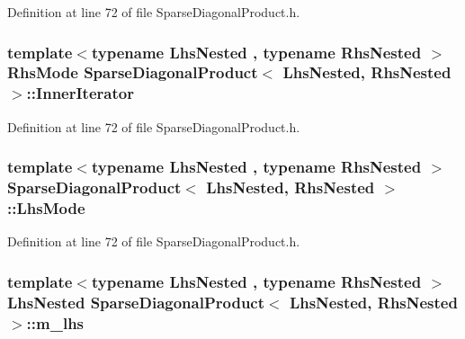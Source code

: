 Definition at line 72 of file Sparse\-Diagonal\-Product.\-h.

\hypertarget{class_sparse_diagonal_product_a5c59ad27902daf0a0fe9ef17c892a18d}{
\subsubsection[{Inner\-Iterator}]{\setlength{\rightskip}{0pt plus 5cm}template$<$typename Lhs\-Nested , typename Rhs\-Nested $>$ Rhs\-Mode {\bf Sparse\-Diagonal\-Product}$<$ Lhs\-Nested, Rhs\-Nested $>$\-::{\bf Inner\-Iterator}}}\label{class_sparse_diagonal_product_a5c59ad27902daf0a0fe9ef17c892a18d}


Definition at line 72 of file Sparse\-Diagonal\-Product.\-h.

\hypertarget{class_sparse_diagonal_product_ab32872fb8d003cf17900c0675eeb5c4b}{
\subsubsection[{Lhs\-Mode}]{\setlength{\rightskip}{0pt plus 5cm}template$<$typename Lhs\-Nested , typename Rhs\-Nested $>$ {\bf Sparse\-Diagonal\-Product}$<$ Lhs\-Nested, Rhs\-Nested $>$\-::Lhs\-Mode}}\label{class_sparse_diagonal_product_ab32872fb8d003cf17900c0675eeb5c4b}


Definition at line 72 of file Sparse\-Diagonal\-Product.\-h.

\hypertarget{class_sparse_diagonal_product_a8545efd692862aef6c97c7c4795ccf86}{
\subsubsection[{m\-\_\-lhs}]{\setlength{\rightskip}{0pt plus 5cm}template$<$typename Lhs\-Nested , typename Rhs\-Nested $>$ Lhs\-Nested {\bf Sparse\-Diagonal\-Product}$<$ Lhs\-Nested, Rhs\-Nested $>$\-::m\-\_\-lhs\hspace{0.3cm}{\ttfamily [protected]}}}\label{class_sparse_diagonal_product_a8545efd692862aef6c97c7c4795ccf86}


